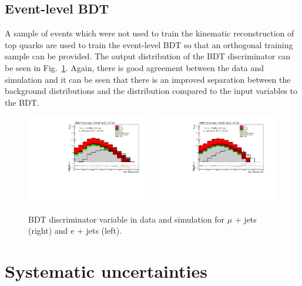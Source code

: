 \subsection{Event-level BDT}
A sample of events which were not used to train the kinematic reconstruction of top quarks are used to train the event-level BDT so that an orthogonal training sample can be provided. 
The output distribution of the BDT discriminator can be seen in Fig.~\ref{fig:BDT}. Again, there is good agreement between the data and simulation and it can be seen that there is an improved separation between the background distributions and the \tttt distribution compared to the input variables to the BDT.

\begin{figure}[!ht]
    \includegraphics[width=0.49\textwidth]{images/Run1/figures/MVA_Mu.pdf}
    \includegraphics[width=0.49\textwidth]{images/Run1/figures/MVA_e.pdf}
    \caption{BDT discriminator variable in data and simulation for $\mu$ + jets (right) and e + jets (left).}
    \label{fig:BDT}
\end{figure}

\section{Systematic uncertainties}
\label{sec:uncertainties8}

